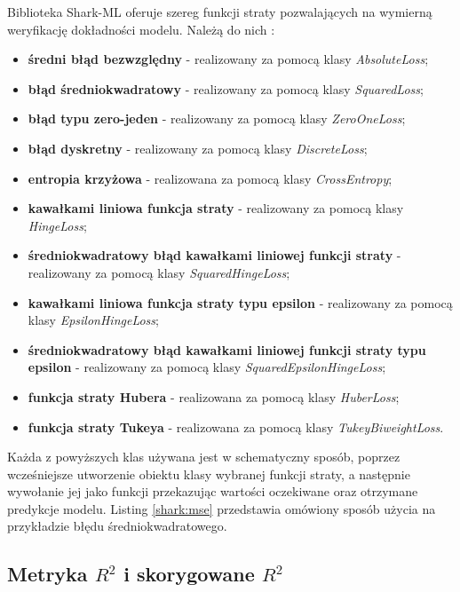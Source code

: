 Biblioteka Shark-ML oferuje szereg funkcji straty pozwalających na wymierną weryfikację dokładności modelu. Należą do nich \cite{shark:loss}:

\begin{itemize}
	\item \textbf{średni błąd bezwzględny} - realizowany za pomocą klasy \textit{AbsoluteLoss};
	\item \textbf{błąd średniokwadratowy} - realizowany za pomocą klasy \textit{SquaredLoss};
	\item \textbf{błąd typu zero-jeden} - realizowany za pomocą klasy \textit{ZeroOneLoss};
	\item \textbf{błąd dyskretny} - realizowany za pomocą klasy \textit{DiscreteLoss};
	\item \textbf{entropia krzyżowa} - realizowana za pomocą klasy \textit{CrossEntropy};
	\item \textbf{kawałkami liniowa funkcja straty} - realizowany za pomocą klasy \textit{HingeLoss};
	\item \textbf{średniokwadratowy błąd kawałkami liniowej funkcji straty} - realizowany za pomocą klasy \textit{SquaredHingeLoss};
	\item \textbf{kawałkami liniowa funkcja straty typu epsilon} - realizowany za pomocą klasy \textit{EpsilonHingeLoss};
	\item \textbf{średniokwadratowy błąd kawałkami liniowej funkcji straty typu epsilon} - realizowany za pomocą klasy \textit{SquaredEpsilonHingeLoss};
	\item \textbf{funkcja straty Hubera} - realizowana za pomocą klasy \textit{HuberLoss};
	\item \textbf{funkcja straty Tukeya} - realizowana za pomocą klasy \textit{TukeyBiweightLoss}.
\end{itemize}

Każda z powyższych klas używana jest w schematyczny sposób, poprzez wcześniejsze utworzenie obiektu klasy wybranej funkcji straty, a następnie wywołanie jej jako funkcji przekazując wartości oczekiwane oraz otrzymane predykcje modelu. Listing \ref{shark:mse} przedstawia omówiony sposób użycia na przykładzie błędu średniokwadratowego.


\subsection{Metryka $R^2$ i skorygowane $R^2$}

